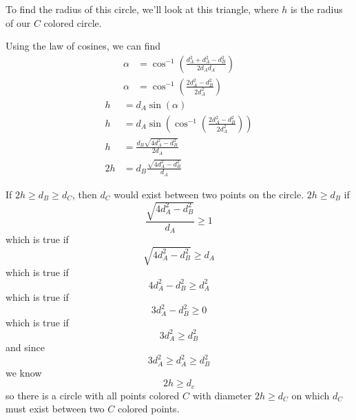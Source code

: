 \documentclass[12pt]{article}
\begin{document}
To find the radius of this circle, we'll look at this triangle, where $h$ is the radius of our $C$ colored circle.

\begin{center}
\end{center}

Using the law of cosines, we can find
\begin{align*}
    \alpha &= \cos^{-1}\left(\frac{d_A^2 + d_A^2 - d_B^2}{2d_Ad_A}\right) \\
    \alpha &= \cos^{-1}\left(\frac{2d_A^2 - d_B^2}{2d_A^2}\right)
\end{align*}
\begin{align*}
    h &= d_A\sin(\alpha) \\
    h &= d_A\sin\left(\cos^{-1}\left(\frac{2d_A^2 - d_B^2}{2d_A^2}\right)\right) \\
    h &= \frac{d_B \sqrt{4 d_A^2 - d_B^2}}{2d_A} \\
    2h &= d_B \frac{\sqrt{4 d_A^2 - d_B^2}}{d_A}  
\end{align*}

If $2h \geq d_B \geq d_C$, then $d_C$ would exist between two points on the circle. $2h \geq d_B$ if
\[\frac{\sqrt{4 d_A^2 - d_B^2}}{d_A} \geq 1\]
which is true if
\[\sqrt{4 d_A^2 - d_B^2} \geq d_A\]
which is true if
\[4 d_A^2 - d_B^2 \geq d_A^2\]
which is true if
\[3 d_A^2 - d_B^2 \geq 0\]
which is true if
\[3 d_A^2 \geq d_B^2\]
and since
\[3 d_A^2 \geq d_A^2 \geq d_B^2\]
we know
\[2h \geq d_c\]
so there is a circle with all points colored $C$ with diameter $2h \geq d_C$ on which $d_C$ must exist between two $C$ colored points.
\end{document}
